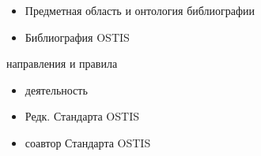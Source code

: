 \begin{SCn}
\begin{scnitemize}
\begin{itemize}
		\item Предметная область и онтология библиографии
		\item Библиография OSTIS
	\end{itemize}	
\end{scnitemize}
\begin{scnitemize}
	\item направления и правила	
	\begin{itemize}
		\item деятельность	
		\item Редк. Стандарта OSTIS
		\item соавтор Стандарта OSTIS
	\end{itemize}
\end{scnitemize}

	
\end{SCn}